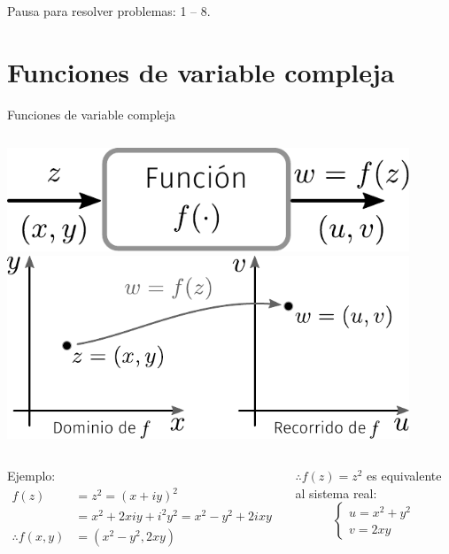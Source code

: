 \documentclass[9pt, aspectratio=169]{beamer}
\begin{document}
\begin{frame}[standout]
	Pausa para resolver problemas: 1 -- 8.
\end{frame}




\section{Funciones de variable compleja}

\begin{frame}{Funciones de variable compleja}
	\begin{columns}[c]
		\includegraphics[width=0.9\textwidth]{figs/fig-01} \pause
		\includegraphics[width=0.9\textwidth]{figs/fig-02}
	\end{columns} \pause

	\begin{columns}[c]
		\begin{exampleblock}{Ejemplo:}
			\begin{align*}
				f(z)               & = z^2 = (x + iy)^2                             \\
				                   & = x^2 + 2 x i y + i^2 y^2 = x^2 - y^2 + 2 i xy \\
				\therefore f(x, y) & = (x^2 - y^2, 2xy)
			\end{align*}
		\end{exampleblock} \pause
		$\therefore f(z) = z^2$ es equivalente al \alert{sistema real}:
		\vspace{1em}
		\[
			\begin{cases*}
				u = x^2 + y^2 \\
				v = 2xy
			\end{cases*}
		\]
	\end{columns}
\end{frame}
\end{document}
